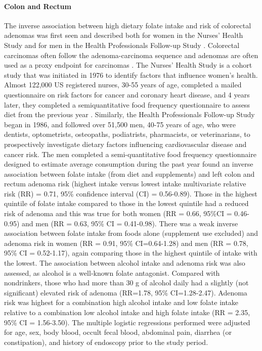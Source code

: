 \paragraph{Colon and Rectum} %
The inverse association between high dietary folate intake and risk of colorectal adenomas was first seen and described both for women in the Nurses' Health Study and for men in the Health Professionals Follow-up Study \cite{c229}. Colorectal carcinomas often follow the adenoma-carcinoma sequence and adenomas are often used as a proxy endpoint for carcinomas \cite{c230}. The Nurses' Health Study is a cohort study that was initiated in 1976 to identify factors that influence women's health. Almost 122,000 US registered nurses, 30-55 years of age, completed a mailed questionnaire on risk factors for cancer and coronary heart disease, and 4 years later, they completed a semiquantitative food frequency questionnaire to assess diet from the previous year \cite{c231}. Similarly, the Health Professionals Follow-up Study began in 1986, and followed over 51,500 men, 40-75 years of age, who were dentists, optometrists, osteopaths, podiatrists, pharmacists, or veterinarians, to prospectively investigate dietary factors influencing cardiovascular disease and cancer risk. The men completed a semi-quantitative food frequency questionnaire designed to estimate average consumption during the past year \cite{c229,c232} found an inverse association between folate intake (from diet and supplements) and left colon and rectum adenoma risk (highest intake versus lowest intake multivariate relative risk (RR) = 0.71, 95\% confidence interval (CI) = 0.56-0.89). Those in the highest quintile of folate intake compared to those in the lowest quintile had a reduced risk of adenoma and this was true for both women (RR = 0.66, 95\%CI = 0.46-0.95) and men (RR = 0.63, 95\% CI = 0.41-0.98). There was a weak inverse association between folate intake from foods alone (supplement use excluded) and adenoma risk in women (RR = 0.91, 95\% CI=0.64-1.28) and men (RR = 0.78, 95\% CI = 0.52-1.17), again comparing those in the highest quintile of intake with the lowest. The association between alcohol intake and adenoma risk was also assessed, as alcohol 
is a well-known folate antagonist. Compared with nondrinkers, those who had more than 30 g of alcohol daily had a slightly (not significant) elevated risk of adenoma (RR=1.78, 95\% CI=1.28-2.47). Adenoma risk was highest for a combination high alcohol intake and low folate intake relative to a combination low alcohol intake and high folate intake (RR = 2.35, 95\% CI = 1.56-3.50). The multiple logistic regressions performed were adjusted for age, sex, body blood, occult fecal blood, abdominal pain, diarrhea (or constipation), and history of endoscopy prior to the study period. 
 
